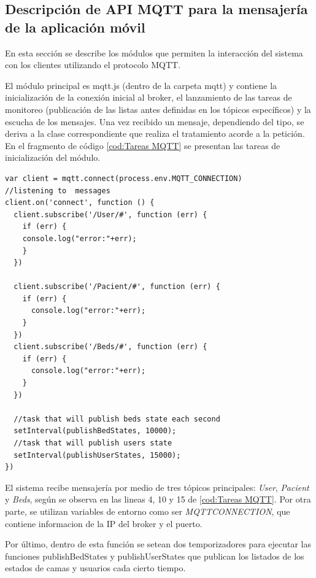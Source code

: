 \subsection{Descripción de API MQTT para la mensajería de la aplicación móvil}

En esta sección se describe los módulos que permiten la interacción del sistema con los clientes utilizando el protocolo MQTT.


El módulo principal es mqtt.js (dentro de la carpeta mqtt) y contiene la inicialización de la conexión inicial al broker, el lanzamiento de las tareas de monitoreo (publicación de las listas antes definidas en los tópicos específicos) y la escucha de los mensajes. Una vez recibido un mensaje, dependiendo del tipo, se deriva a la clase correspondiente que realiza el tratamiento acorde a la petición. En el fragmento de código  \ref{cod:Tareas MQTT} se presentan las tareas de inicialización del módulo.



\begin{lstlisting}[label=cod:Tareas MQTT,caption=  Tareas ejecutadas por mqtt.js]
var client = mqtt.connect(process.env.MQTT_CONNECTION)
//listening to  messages
client.on('connect', function () {
  client.subscribe('/User/#', function (err) {
    if (err) {
    console.log("error:"+err);
    }
  })

  client.subscribe('/Pacient/#', function (err) {
    if (err) {      
      console.log("error:"+err);
    }
  })
  client.subscribe('/Beds/#', function (err) {
    if (err) {      
      console.log("error:"+err);
    }
  })

  //task that will publish beds state each second
  setInterval(publishBedStates, 10000);
  //task that will publish users state 
  setInterval(publishUserStates, 15000);
})
\end{lstlisting}

El sistema recibe mensajería por medio de tres tópicos principales: \textit{User}, \textit{Pacient} y \textit{Beds}, según se observa en las lineas 4, 10 y 15 de \ref{cod:Tareas MQTT}. Por otra parte, se utilizan variables de entorno como ser \textit{MQTT\textunderscore CONNECTION}, que contiene informacion de la IP del broker y el puerto.

Por último, dentro de esta función se setean dos temporizadores para ejecutar las funciones publishBedStates y publishUserStates que publican los listados de los estados de camas y usuarios cada cierto tiempo.




